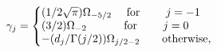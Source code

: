 \begin{equation}
    \label{gammas}
    \gamma_j=
    \left\{
    \begin{minipage}[c]{7cm}
        $(1/ 2\sqrt{\pi}) {\Omega_{-5/2}} \quad$ {\rm for}
        \qquad  $j=-1$\\
        ${(3/ 2)} \Omega_{-2} \quad\qquad$ {\rm for} \qquad
        $j=0$\\
        ${-(d_j / \Gamma(j/2))}\Omega_{j/2-2} \qquad
        \rm{otherwise}$,
    \end{minipage}
\right.
\end{equation}

